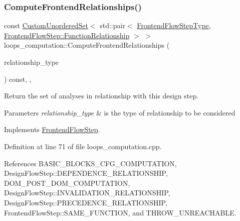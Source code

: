 \subsubsection{\texorpdfstring{Compute\+Frontend\+Relationships()}{ComputeFrontendRelationships()}}
{\footnotesize\ttfamily const \hyperlink{classCustomUnorderedSet}{Custom\+Unordered\+Set}$<$ std\+::pair$<$ \hyperlink{frontend__flow__step_8hpp_afeb3716c693d2b2e4ed3e6d04c3b63bb}{Frontend\+Flow\+Step\+Type}, \hyperlink{classFrontendFlowStep_af7cf30f2023e5b99e637dc2058289ab0}{Frontend\+Flow\+Step\+::\+Function\+Relationship} $>$ $>$ loops\+\_\+computation\+::\+Compute\+Frontend\+Relationships (\begin{DoxyParamCaption}\item[{const \hyperlink{classDesignFlowStep_a723a3baf19ff2ceb77bc13e099d0b1b7}{Design\+Flow\+Step\+::\+Relationship\+Type}}]{relationship\+\_\+type }\end{DoxyParamCaption}) const\hspace{0.3cm}{\ttfamily [override]}, {\ttfamily [private]}, {\ttfamily [virtual]}}



Return the set of analyses in relationship with this design step. 


\begin{DoxyParams}{Parameters}
{\em relationship\+\_\+type} & is the type of relationship to be considered \\
\hline
\end{DoxyParams}


Implements \hyperlink{classFrontendFlowStep_abeaff70b59734e462d347ed343dd700d}{Frontend\+Flow\+Step}.



Definition at line 71 of file loops\+\_\+computation.\+cpp.



References B\+A\+S\+I\+C\+\_\+\+B\+L\+O\+C\+K\+S\+\_\+\+C\+F\+G\+\_\+\+C\+O\+M\+P\+U\+T\+A\+T\+I\+ON, Design\+Flow\+Step\+::\+D\+E\+P\+E\+N\+D\+E\+N\+C\+E\+\_\+\+R\+E\+L\+A\+T\+I\+O\+N\+S\+H\+IP, D\+O\+M\+\_\+\+P\+O\+S\+T\+\_\+\+D\+O\+M\+\_\+\+C\+O\+M\+P\+U\+T\+A\+T\+I\+ON, Design\+Flow\+Step\+::\+I\+N\+V\+A\+L\+I\+D\+A\+T\+I\+O\+N\+\_\+\+R\+E\+L\+A\+T\+I\+O\+N\+S\+H\+IP, Design\+Flow\+Step\+::\+P\+R\+E\+C\+E\+D\+E\+N\+C\+E\+\_\+\+R\+E\+L\+A\+T\+I\+O\+N\+S\+H\+IP, Frontend\+Flow\+Step\+::\+S\+A\+M\+E\+\_\+\+F\+U\+N\+C\+T\+I\+ON, and T\+H\+R\+O\+W\+\_\+\+U\+N\+R\+E\+A\+C\+H\+A\+B\+LE.

\mbox{\label{classloops__computation_a9faf9a8d51f9f0ab9015e44bc912d4e4}} 
